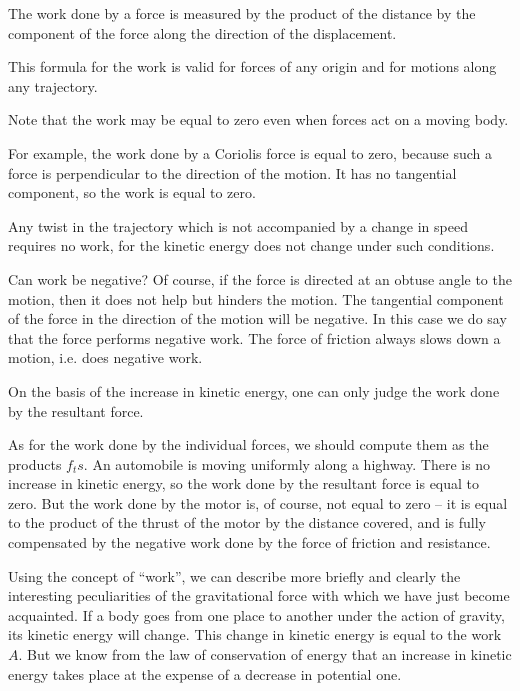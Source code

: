 The work done by a force is measured by the product of
the distance by the component of the force along the
direction of the displacement.

This formula for the work is valid for forces of any
origin and for motions along any trajectory.

Note that the work may be equal to zero even when
forces act on a moving body.

For example, the work done by a Coriolis force is equal
to zero, because such a force is perpendicular to the direction of the motion. It has no tangential component, so the work is equal to zero.

Any twist in the trajectory which is not accompanied
by a change in speed requires no work, for the kinetic energy does not change under such conditions.

Can work be negative? Of course, if the force is directed
at an obtuse angle to the motion, then it does not help
but hinders the motion. The tangential component of the
force in the direction of the motion will be negative. In
this case we do say that the force performs negative work.
The force of friction always slows down a motion, i.e.
does negative work.

On the basis of the increase in kinetic energy, one can
only judge the work done by the resultant force.

As for the work done by the individual forces, we should
compute them as the products $f_{t}s$. An automobile is moving uniformly along a highway. There is no increase in
kinetic energy, so the work done by the resultant force
is equal to zero. But the work done by the motor is, of
course, not equal to zero -- it is equal to the product of
the thrust of the motor by the distance covered, and is
fully compensated by the negative work done by the force
of friction and resistance.

Using the concept of ``work'', we can describe more
briefly and clearly the interesting peculiarities of the
gravitational force with which we have just become acquainted. If a body goes from one place to another under
the action of gravity, its kinetic energy will change. This
change in kinetic energy is equal to the work $A$. But we
know from the law of conservation of energy that an
increase in kinetic energy takes place at the expense of
a decrease in potential one.

